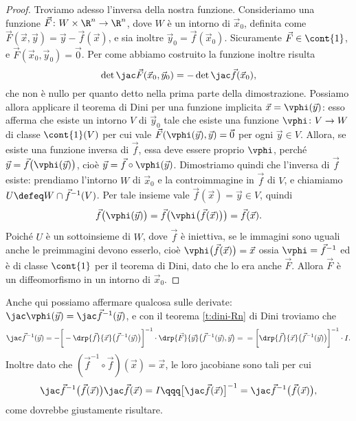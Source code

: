 \begin{proof}
	Troviamo adesso l'inversa della nostra funzione.
	Consideriamo una funzione $\vec F\colon W\times\R^n\to\R^n$, dove $W$ è un intorno di $\vec x_0$, definita come $\vec F(\vec x,\vec y)=\vec y-\vec f(\vec x)$, e sia inoltre $\vec y_0=\vec f(\vec x_0)$.
	Sicuramente $\vec F\in\cont{1}$, e $\vec F(\vec x_0,\vec y_0)=\vec 0$.
	Per come abbiamo costruito la funzione inoltre risulta
	\begin{equation}
		\det\jac\vec F(\vec x_0,\vec y_0)=-\det\jac\vec f(\vec x_0),
	\end{equation}
	che non è nullo per quanto detto nella prima parte della dimostrazione.
	Possiamo allora applicare il teorema di Dini per una funzione implicita $\vec x=\vphi(\vec y)$: esso afferma che esiste un intorno $V$ di $\vec y_0$ tale che esiste una funzione $\vphi\colon V\to W$ di classe $\cont{1}(V)$ per cui vale $\vec F(\vphi(\vec y),\vec y)=\vec 0$ per ogni $\vec y\in V$.
	Allora, se esiste una funzione inversa di $\vec f$, essa deve essere proprio $\vphi$, perch\'e $\vec y=\vec f\big(\vphi(\vec y)\big)$, cioè $\vec y=\vec f\circ \vphi(\vec y)$.
	Dimostriamo quindi che l'inversa di $\vec f$ esiste: prendiamo l'intorno $W$ di $\vec x_0$ e la controimmagine in $\vec f$ di $V$, e chiamiamo $U\defeq W\cap\vec f^{-1}(V)$.
	Per tale insieme vale $\vec f(\vec x)=\vec y\in V$, quindi
	\begin{equation*}
		\vec f\big(\vphi(\vec y)\big)=\vec f\big(\vphi\big(\vec f(\vec x)\big)\big)=\vec f(\vec x).
	\end{equation*}
	Poiché $U$ è un sottoinsieme di $W$, dove $\vec f$ è iniettiva, se le immagini sono uguali anche le preimmagini devono esserlo, cioè $\vphi\big(\vec f(\vec x)\big)=\vec x$ ossia $\vphi=\vec f^{-1}$ ed è di classe $\cont{1}$ per il teorema di Dini, dato che lo era anche $\vec F$.
	Allora $\vec F$ è un diffeomorfismo in un intorno di $\vec x_0$.
\end{proof}
Anche qui possiamo affermare qualcosa sulle derivate: $\jac\vphi(\vec y)=\jac\vec f^{-1}(\vec y)$, e con il teorema \ref{t:dini-Rn} di Dini troviamo che
\begin{equation}
	\jac\vec f^{-1}(\vec y)=-\bigg[-\drp{\vec f}{\vec x}\big(\vec f^{-1}(\vec y)\big)\bigg]^{-1}\cdot\drp{\vec F}{\vec y}\big(\vec f^{-1}(\vec y),\vec y\big)=\\
	=\bigg[\drp{\vec f}{\vec x}\big(\vec f^{-1}(\vec y)\big)\bigg]^{-1}\cdot I.
\end{equation}
Inoltre dato che $(\vec f^{-1}\circ\vec f)(\vec x)=\vec x$, le loro jacobiane sono tali per cui
\begin{equation*}
	\jac\vec f^{-1}\big(\vec f(\vec x)\big)\jac\vec f(\vec x)=I\qqq \big[\jac\vec f(\vec x)\big]^{-1}=\jac\vec f^{-1}\big(\vec f(\vec x)\big),
\end{equation*}
come dovrebbe giustamente risultare.

